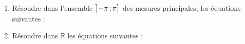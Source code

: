 \documentclass{book}
\begin{document}
\begin{multicols*}{2}
\begin{enumerate}
\item R\'esoudre dans l'ensemble $\Se\big]-\pi\,;\,\pi\big]$ des mesures principales, les \'equations suivantes :


\item R\'esoudre dans $\mathbb{R}$ les \'equations suivantes :

\end{enumerate}

\end{multicols*}
\end{document}
